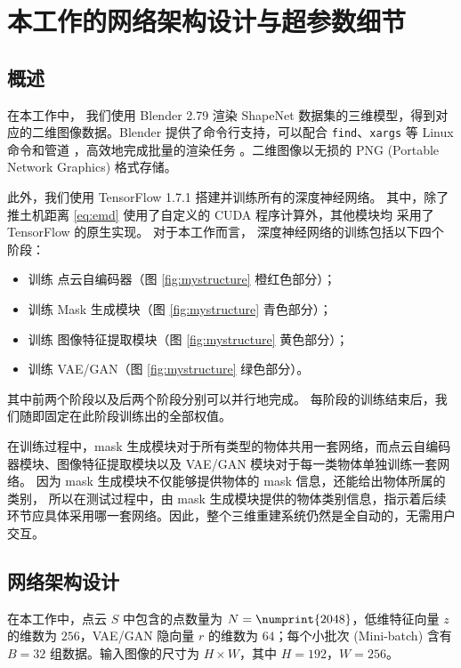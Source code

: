 \chapter{本工作的网络架构设计与超参数细节}
\label{cha:detail}

\section{概述}
在本工作中，
我们使用 Blender 2.79 渲染 ShapeNet\cite{shapenet} 数据集的三维模型，得到对应的二维图像数据。Blender 提供了命令行支持，可以配合 \texttt{find}、\texttt{xargs} 等 Linux 命令和管道
，高效地完成批量的渲染任务%
。二维图像以无损的 PNG (Portable Network Graphics) 格式存储。

此外，我们使用 TensorFlow 1.7.1 搭建并训练所有的深度神经网络。
其中，除了推土机距离 \eqref{eq:emd} 使用了自定义的 CUDA %
程序计算外，其他模块均
采用了 TensorFlow 的原生实现。
对于本工作而言，
深度神经网络的训练包括以下四个阶段：
\begin{itemize}
	\item 训练 点云自编码器（图 \ref{fig:mystructure} 橙红色部分）；
	\item 训练 Mask 生成模块（图 \ref{fig:mystructure} 青色部分）；
	\item 训练 图像特征提取模块（图 \ref{fig:mystructure} 黄色部分）；
	\item 训练 VAE/GAN（图 \ref{fig:mystructure} 绿色部分）。
\end{itemize}
其中前两个阶段以及后两个阶段分别可以并行地完成。
每阶段的训练结束后，我们随即固定在此阶段训练出的全部权值。

在训练过程中，mask 生成模块对于所有类型的物体共用一套网络，而点云自编码器模块、图像特征提取模块以及 VAE/GAN 模块对于每一类物体单独训练一套网络。
因为 mask 生成模块不仅能够提供物体的 mask 信息，还能给出物体所属的类别，
所以在测试过程中，由 mask 生成模块提供的物体类别信息，指示着后续环节应具体采用哪一套网络。因此，整个三维重建系统仍然是全自动的，无需用户交互。

\section{网络架构设计}
在本工作中，点云 $S$ 中包含的点数量为 $N = \numprint{2048}$，低维特征向量 $z$ 的维数为 $256$，VAE/GAN 隐向量 $r$ 的维数为 $64$；每个小批次 (Mini-batch) 含有 $B = 32$ 组数据。输入图像的尺寸为 $H \times W$，其中 $H = 192$，$W = 256$。

